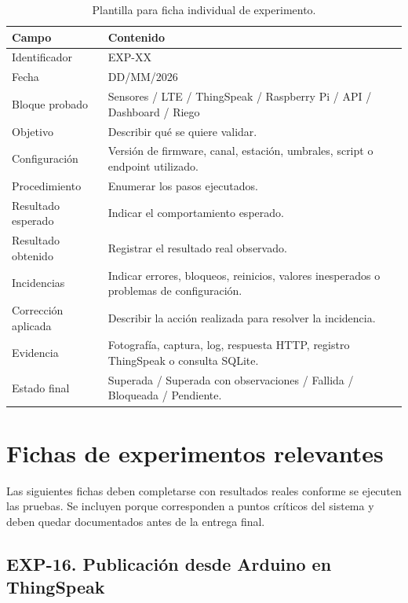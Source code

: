 \begin{table}[H]
\centering
\renewcommand{\arraystretch}{1.25}
\small
\begin{tabular}{|p{}|p{}|}
\hline
\rowcolor{gray!20}
\textbf{Campo} & \textbf{Contenido} \\
\hline
Identificador & EXP-XX \\
\hline
Fecha & DD/MM/2026 \\
\hline
Bloque probado & Sensores / LTE / ThingSpeak / Raspberry Pi / API / Dashboard / Riego \\
\hline
Objetivo & Describir qué se quiere validar. \\
\hline
Configuración & Versión de firmware, canal, estación, umbrales, script o endpoint utilizado. \\
\hline
Procedimiento & Enumerar los pasos ejecutados. \\
\hline
Resultado esperado & Indicar el comportamiento esperado. \\
\hline
Resultado obtenido & Registrar el resultado real observado. \\
\hline
Incidencias & Indicar errores, bloqueos, reinicios, valores inesperados o problemas de configuración. \\
\hline
Corrección aplicada & Describir la acción realizada para resolver la incidencia. \\
\hline
Evidencia & Fotografía, captura, log, respuesta HTTP, registro ThingSpeak o consulta SQLite. \\
\hline
Estado final & Superada / Superada con observaciones / Fallida / Bloqueada / Pendiente. \\
\hline
\end{tabular}
\caption{Plantilla para ficha individual de experimento.}
\label{tab:plantilla_ficha_experimento}
\end{table}

\section{Fichas de experimentos relevantes}

Las siguientes fichas deben completarse con resultados reales conforme se ejecuten las pruebas. Se incluyen porque corresponden a puntos críticos del sistema y deben quedar documentados antes de la entrega final.

\subsection{EXP-16. Publicación desde Arduino en ThingSpeak}

